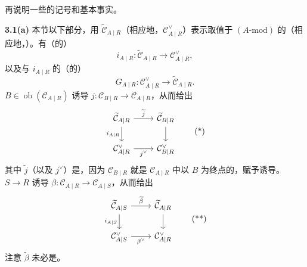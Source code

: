 再说明一些的记号和基本事实。

\textbf{3.1(a)} 本节以下部分，用 $\widetilde{\mathcal C}_{A\mid R}$（相应地，$\mathcal C_{A\mid R}^{\vee}$）表示取值于 $(A\text{-mod})$ 的（相应地，）。有（的）
\[i_{A\mid R}:\widetilde{\mathcal C}_{A\mid R}\longrightarrow\mathcal C_{A\mid R}^{\vee},\]
以及与 $i_{A\mid R}$ 的（的）
\[G_{A\mid R}:\mathcal C_{A\mid R}^{\vee}\longrightarrow\widetilde{\mathcal C}_{A\mid R}.\]
 $B\in\operatorname{ob}(\mathcal C_{A\mid R})$ 诱导 $j:\mathcal C_{B\mid R}\to\mathcal C_{A\mid R}$，从而给出
\[
\begin{tikzcd}
\widetilde{\mathcal C}_{A\mid R}\arrow[r,"\widetilde j"]\arrow[d,"i_{A\mid R}"']&\widetilde{\mathcal C}_{B\mid R}\arrow[d]\\
\mathcal C_{A\mid R}^{\vee}\arrow[r,"j^{\vee}"']&\mathcal C_{B\mid R}^{\vee}
\end{tikzcd}\tag{*}
\]
其中 $\widetilde j$（以及 $j^{\vee}$）是，因为 $\mathcal C_{B\mid R}$ 就是 $\mathcal C_{A\mid R}$ 中以 $B$ 为终点的，赋予诱导。 $S\to R$ 诱导 $\beta:\mathcal C_{A\mid R}\to\mathcal C_{A\mid S}$，从而给出
\[
\begin{tikzcd}
\widetilde{\mathcal C}_{A\mid S}\arrow[r,"\widetilde\beta"]\arrow[d,"i_{A\mid S}"']&\widetilde{\mathcal C}_{A\mid R}\arrow[d]\\
\mathcal C_{A\mid S}^{\vee}\arrow[r,"\beta^{\vee}"']&\mathcal C_{A\mid R}^{\vee}
\end{tikzcd}\tag{**}
\]
注意 $\widetilde\beta$ 未必是。

